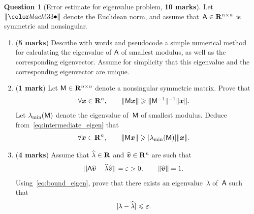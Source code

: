 \documentclass[11pt]{article}
\theoremstyle{definition}
\newtheorem{question}{Question}
\theoremstyle{remark}
\begin{document}
\newpage
\begin{question}
    [Error estimate for eigenvalue problem, \textbf{10 marks}]
    Let $\norm{\placeholder}$ denote the Euclidean norm,
    and assume that~$\mathsf A \in \mathbf R^{n \times n}$ is symmetric and nonsingular.

    \begin{enumerate}
        \item
            (\textbf{5 marks})
            Describe with words and pseudocode a simple numerical method for calculating the eigenvalue of $\mathsf A$ of smallest modulus,
            as well as the corresponding eigenvector.
            Assume for simplicity that this eigenvalue and the corresponding eigenvector are unique.

        \item
            (\textbf{1 mark})
            Let $\mathsf M \in \mathbf R^{n \times n}$ denote a nonsingular symmetric matrix.
            Prove that
            \begin{equation}
                \label{eq:intermediate_eigen}
                \forall \mathbf{\boldsymbol{x}} \in \mathbf R^n, \qquad
                \lVert\mathsf M \mathbf{\boldsymbol{x}}\rVert \geqslant \lVert\mathsf M^{-1}\rVert^{-1} \lVert\mathbf{\boldsymbol{x}}\rVert.
            \end{equation}
            Let $\lambda_{\min}(\mathsf M)$ denote the eigenvalue of~$\mathsf M$ of smallest modulus.
            Deduce from~\eqref{eq:intermediate_eigen} that
            \begin{equation}
                \label{eq:bound_eigen}
                \forall \mathbf{\boldsymbol{x}} \in \mathbf R^n, \qquad
                \lVert\mathsf M \mathbf{\boldsymbol{x}}\rVert \geqslant \lvert\lambda_{\min}(\mathsf M)\rvert \lVert\mathbf{\boldsymbol{x}}\rVert.
            \end{equation}

        \item
            (\textbf{4 marks})
            Assume that $\widehat \lambda \in \mathbf R$ and $\widehat{\mathbf{\boldsymbol{v}}} \in \mathbf R^n$ are such that
            \begin{equation}
                \label{eq:bound}
                \lVert\mathsf A \widehat{\mathbf{\boldsymbol{v}}} - \widehat{\lambda} \widehat{\mathbf{\boldsymbol{v}}}\rVert = \varepsilon > 0,
                \qquad \lVert\widehat {\mathbf{\boldsymbol{v}}}\rVert = 1.
            \end{equation}
            Using~\eqref{eq:bound_eigen},
            prove that there exists an eigenvalue~$\lambda$ of~$\mathsf A$ such that
            \[
                \lvert\lambda - \widehat \lambda\rvert \leqslant \varepsilon.
            \]


\end{enumerate}
\end{question}
\end{document}
